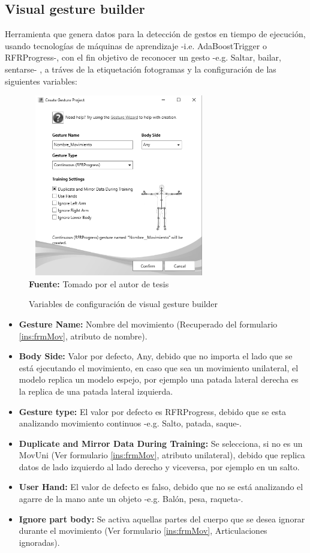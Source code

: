 \subsection{Visual gesture builder} \label{ins:VisualGestureBuilder}
Herramienta que genera datos para la detecci\'on de gestos en tiempo de ejecuci\'on, usando tecnolog\'ias de m\'aquinas de aprendizaje -i.e. AdaBoostTrigger o RFRProgress-, con el fin objetivo de reconocer un gesto -e.g. Saltar, bailar, sentarse- \cite{KinectBuilder2019}, a tr\'aves de la etiquetaci\'on  fotogramas y la configuraci\'on de las siguientes variables:
 \begin{figure}[H]
	\caption{Variables de configuraci\'on de visual gesture builder}
	\label{fig:visualGesture}
	\centering
	\includegraphics[width=300px,height=300px]{graphics/settingsGesture.PNG} \\
	\textbf{Fuente:} Tomado por el autor de tesis
\end{figure} 
\begin{itemize}
\item \textbf{Gesture Name:} Nombre del movimiento  (Recuperado del formulario \ref{ins:frmMov}, atributo de nombre).
\item \textbf{Body Side:} Valor por defecto, Any, debido que no importa el lado que se est\'a ejecutando el movimiento, en caso que sea un movimiento unilateral, el modelo replica un modelo espejo, por ejemplo una patada lateral derecha es la replica de una patada lateral izquierda.
\item \textbf{Gesture type:} El valor por defecto es RFRProgress, debido que se esta analizando movimiento continuos -e.g. Salto, patada, saque-.
\item \textbf{Duplicate and Mirror Data During Training:} Se selecciona, si no es un \gls{MovUni} (Ver formulario \ref{ins:frmMov}, atributo unilateral), debido que replica datos de lado izquierdo al lado derecho y viceversa, por ejemplo en un salto.
\item \textbf{User Hand:} El valor de defecto es falso, debido que no se est\'a analizando el agarre de la mano ante un objeto -e.g. Bal\'on, pesa, raqueta-.
\item \textbf{Ignore part body:} Se activa aquellas partes del cuerpo que se desea ignorar durante el movimiento (Ver formulario \ref{ins:frmMov}, Articulaciones ignoradas).
\end{itemize}
